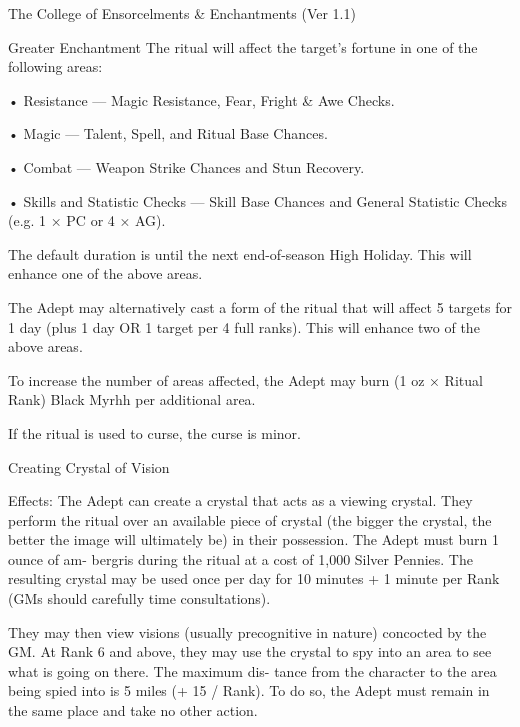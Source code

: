 \begin{Chapter}{The College of Ensorcelments \& Enchantments (Ver 1.1)}
\begin{ritual}[Q-1]{Greater Enchantment }
The ritual will affect the target’s fortune in one of 
the following areas:  

•  Resistance  —  Magic  Resistance,  Fear,  Fright  \& 
Awe Checks.  

• Magic — Talent, Spell, and Ritual Base Chances.  

•  Combat  —  Weapon  Strike  Chances  and  Stun 
Recovery.  

• Skills and Statistic Checks — Skill Base Chances 
and  General  Statistic  Checks  (e.g.  1  ×  PC  or  4  × 
AG). 

The default duration is until the next end-of-season 
High  Holiday.  This  will  enhance  one  of  the  above 
areas. 

The  Adept  may  alternatively  cast  a  form  of  the 
ritual that will affect 5 targets for 1 day (plus 1 day 
OR  1  target  per  4  full  ranks).  This  will  enhance 
two of the above areas. 

To  increase  the  number  of  areas  affected,  the 
Adept may burn (1 oz × Ritual Rank) Black Myrhh 
per additional area. 

If the ritual is used to curse, the curse is minor. 
\end{ritual}

\begin{ritual}[Q-2]{Creating Crystal of Vision }

Effects: The Adept can create a crystal that acts as 
a  viewing  crystal.  They  perform the  ritual  over  an 
available  piece  of  crystal  (the  bigger  the  crystal, 
the  better  the  image  will  ultimately  be)  in  their 
possession.  The  Adept  must  burn  1  ounce  of  am-
bergris  during  the  ritual  at  a  cost  of  1,000  Silver 
Pennies.  The  resulting  crystal  may  be  used  once 
per day for 10 minutes + 1 minute per Rank (GMs 
should carefully time consultations). 

They  may  then  view  visions  (usually  precognitive 
in  nature)  concocted  by  the  GM.  At  Rank  6  and 
above, they may use the crystal to spy into an area 
to  see  what  is  going  on  there.  The  maximum  dis-
tance  from  the  character  to  the  area  being  spied 
into is 5 miles (+ 15 / Rank). To do so, the Adept 
must  remain  in  the  same  place  and  take  no  other 
action. 


\end{ritual}
\end{Chapter}
